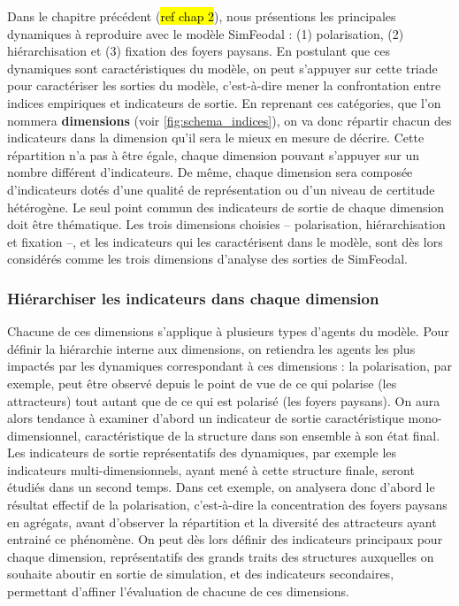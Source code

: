 Dans le chapitre précédent (\hl{ref chap 2}), nous présentions les principales dynamiques à reproduire avec le modèle SimFeodal :
(1) polarisation, (2) hiérarchisation et (3) fixation des foyers paysans.
En postulant que ces dynamiques sont caractéristiques du modèle, on peut s'appuyer sur cette triade pour caractériser les sorties du modèle, c'est-à-dire mener la confrontation entre indices empiriques et indicateurs de sortie.
En reprenant ces catégories, que l'on nommera \textbf{dimensions} (voir \cref{fig:schema_indices}), on va donc répartir chacun des indicateurs dans la dimension qu'il sera le mieux en mesure de décrire.
Cette répartition n'a pas à être égale, chaque dimension pouvant s'appuyer sur un nombre différent d'indicateurs.
De même, chaque dimension sera composée d'indicateurs dotés d'une qualité de représentation ou d'un niveau de certitude hétérogène.
Le seul point commun des indicateurs de sortie de chaque dimension doit être thématique.
Les trois dimensions choisies -- polarisation, hiérarchisation et fixation --, et les indicateurs qui les caractérisent dans le modèle, sont dès lors considérés comme les trois dimensions d'analyse des sorties de SimFeodal.

\subsubsection{Hiérarchiser les indicateurs dans chaque dimension}\label{par:hierarchie_interne}
Chacune de ces dimensions s'applique à plusieurs types d'agents du modèle.
Pour définir la hiérarchie interne aux dimensions, on retiendra les agents les plus impactés par les dynamiques correspondant à ces dimensions :
la polarisation, par exemple, peut être observé depuis le point de vue de ce qui polarise (les attracteurs) tout autant que de ce qui est polarisé (les foyers paysans).
On aura alors tendance à examiner d'abord un indicateur de sortie caractéristique mono-dimensionnel, caractéristique de la structure dans son ensemble à son état final.
Les indicateurs de sortie représentatifs des dynamiques, par exemple les indicateurs multi-dimensionnels, ayant mené à cette structure finale, seront étudiés dans un second temps.
Dans cet exemple, on analysera donc d'abord le résultat effectif de la polarisation, c'est-à-dire la concentration des foyers paysans en agrégats, avant d'observer la répartition et la diversité des attracteurs ayant entrainé ce phénomène.
On peut dès lors définir des \og indicateurs principaux\fg{} pour chaque dimension, représentatifs des grands traits des structures auxquelles on souhaite aboutir en sortie de simulation, et des \og indicateurs secondaires\fg{}, permettant d'affiner l'évaluation de chacune de ces dimensions.

